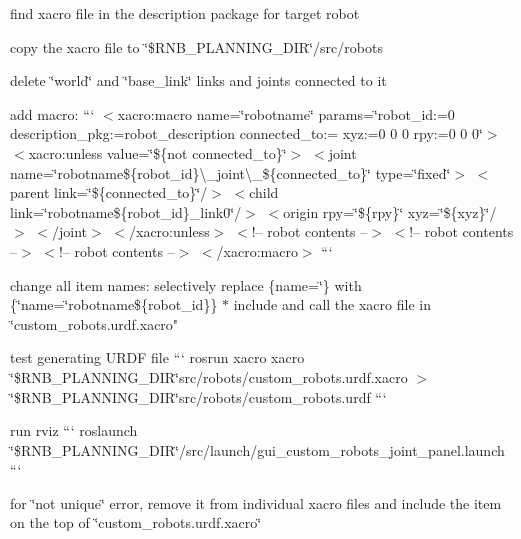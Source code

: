 \begin{DoxyItemize}
\item find xacro file in the description package for target robot
\item copy the xacro file to \char`\"{}\$\+R\+N\+B\+\_\+\+P\+L\+A\+N\+N\+I\+N\+G\+\_\+\+D\+I\+R\char`\"{}/src/robots
\item delete \char`\"{}world\char`\"{} and \char`\"{}base\+\_\+link\char`\"{} links and joints connected to it
\item add macro\+: ``` $<$xacro\+:macro name=\char`\"{}robotname\char`\"{} params=\char`\"{}robot\+\_\+id\+:=\textquotesingle{}0\textquotesingle{} description\+\_\+pkg\+:=\textquotesingle{}robot\+\_\+description\textquotesingle{} connected\+\_\+to\+:=\textquotesingle{}\textquotesingle{} xyz\+:=\textquotesingle{}0 0 0\textquotesingle{} rpy\+:=\textquotesingle{}0 0 0\textquotesingle{}\char`\"{}$>$ $<$xacro\+:unless value=\char`\"{}\$\{not connected\+\_\+to\}\char`\"{}$>$ $<$joint name=\char`\"{}robotname\$\{robot\+\_\+id\}\textbackslash{}\+\_\+joint\textbackslash{}\+\_\+\$\{connected\+\_\+to\}\char`\"{} type=\char`\"{}fixed\char`\"{}$>$ $<$parent link=\char`\"{}\$\{connected\+\_\+to\}\char`\"{}/$>$ $<$child link=\char`\"{}robotname\$\{robot\+\_\+id\}\+\_\+link0\char`\"{}/$>$ $<$origin rpy=\char`\"{}\$\{rpy\}\char`\"{} xyz=\char`\"{}\$\{xyz\}\char`\"{}/$>$ $<$/joint$>$ $<$/xacro\+:unless$>$ $<$!-- robot contents --$>$ $<$!-- robot contents --$>$ $<$!-- robot contents --$>$ $<$/xacro\+:macro$>$ ```
\item change all item names\+: selectively replace \{name=\char`\"{}\} with \{\char`\"{}name=\char`\"{}robotname\$\{robot\+\_\+id\}\}  
$\ast$ include and call the xacro file in \char`\"{}custom\+\_\+robots.\+urdf.\+xacro"
\item test generating U\+R\+DF file ``` rosrun xacro xacro \char`\"{}\$\+R\+N\+B\+\_\+\+P\+L\+A\+N\+N\+I\+N\+G\+\_\+\+D\+I\+R\char`\"{}src/robots/custom\+\_\+robots.\+urdf.\+xacro $>$ \char`\"{}\$\+R\+N\+B\+\_\+\+P\+L\+A\+N\+N\+I\+N\+G\+\_\+\+D\+I\+R\char`\"{}src/robots/custom\+\_\+robots.\+urdf ```
\item run rviz ``` roslaunch \char`\"{}\$\+R\+N\+B\+\_\+\+P\+L\+A\+N\+N\+I\+N\+G\+\_\+\+D\+I\+R\char`\"{}/src/launch/gui\+\_\+custom\+\_\+robots\+\_\+joint\+\_\+panel.launch ```
\begin{DoxyItemize}
\item for \char`\"{}not unique\char`\"{} error, remove it from individual xacro files and include the item on the top of \char`\"{}custom\+\_\+robots.\+urdf.\+xacro\char`\"{}
\end{DoxyItemize}
\end{DoxyItemize}

